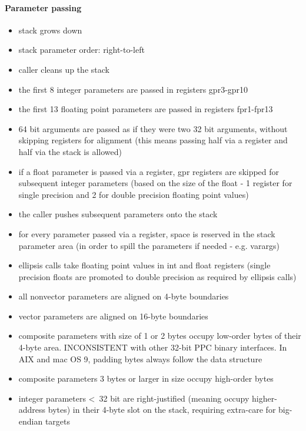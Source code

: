 \paragraph{Parameter passing}

\begin{itemize}
\item stack grows down
\item stack parameter order: right-to-left
\item caller cleans up the stack
\item the first 8 integer parameters are passed in registers gpr3-gpr10
\item the first 13 floating point parameters are passed in registers fpr1-fpr13
\item 64 bit arguments are passed as if they were two 32 bit arguments, without skipping registers for alignment (this means passing half via a register and half via the stack is allowed)
\item if a float parameter is passed via a register, gpr registers are skipped for subsequent integer parameters (based on the size of
the float - 1 register for single precision and 2 for double precision floating point values)
\item the caller pushes subsequent parameters onto the stack
\item for every parameter passed via a register, space is reserved in the stack parameter area (in order to spill the parameters if
needed - e.g. varargs)
\item ellipsis calls take floating point values in int and float registers (single precision floats are promoted to double precision as
required by ellipsis calls)
\item all nonvector parameters are aligned on 4-byte boundaries
\item vector parameters are aligned on 16-byte boundaries
\item composite parameters with size of 1 or 2 bytes occupy low-order bytes of their 4-byte area. INCONSISTENT with other 32-bit PPC
binary interfaces. In AIX and mac OS 9, padding bytes always follow the data structure
\item composite parameters 3 bytes or larger in size occupy high-order bytes
\item integer parameters \textless\ 32 bit are right-justified (meaning occupy higher-address bytes) in their 4-byte slot on the stack, requiring extra-care for big-endian targets
\end{itemize}


